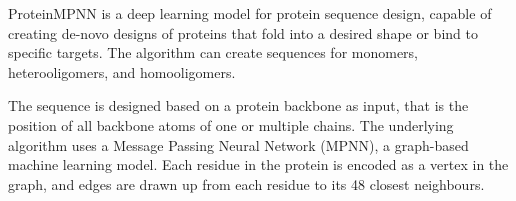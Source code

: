 ProteinMPNN \cite{PMPNN2022} is a deep learning model for protein sequence design, capable of creating de-novo designs of proteins that fold into a desired shape or bind to specific targets. The algorithm can create sequences for monomers, heterooligomers, and homooligomers. 

The sequence is designed based on a protein backbone as input, that is the position of all backbone atoms of one or multiple chains. The underlying algorithm uses a Message Passing Neural Network (MPNN), a graph-based machine learning model. Each residue in the protein is encoded as a vertex in the graph, and edges are drawn up from each residue to its 48 closest neighbours. 